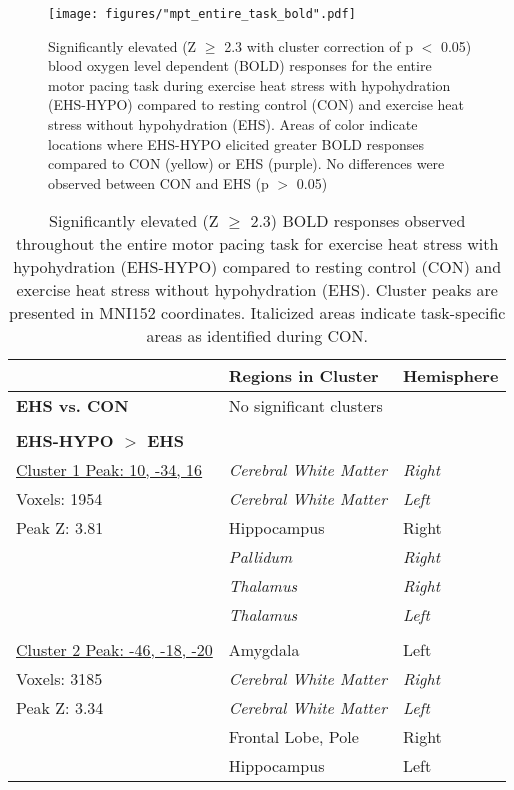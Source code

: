 \begin{figure}
	\centering
	\texttt{[image: figures/"mpt\_entire\_task\_bold".pdf]}
	\caption{Significantly elevated (Z ${\ge}$ 2.3 with cluster correction of p ${<}$ 0.05) blood oxygen level dependent (BOLD) responses for the entire motor pacing task during exercise heat stress with hypohydration (EHS-HYPO) compared to resting control (CON) and exercise heat stress without hypohydration (EHS). Areas of color indicate locations where EHS-HYPO elicited greater BOLD responses compared to CON (yellow) or EHS (purple). No differences were observed between CON and EHS (p ${>}$ 0.05)}
	\label{fig:mpt_entire_task_bold}	
\end{figure}

\begin{table}
	\caption{Significantly elevated (Z ${\ge}$ 2.3) BOLD responses observed throughout the entire motor pacing task for exercise heat stress with hypohydration (EHS-HYPO) compared to resting control (CON) and exercise heat stress without hypohydration (EHS). Cluster peaks are presented in MNI152 coordinates. Italicized areas indicate task-specific areas as identified during CON.}
	\centering
	\begin{tabular}{lll} 
		\hline
		& Regions in Cluster & Hemisphere \\
		\hline
		\textbf{EHS vs. CON} & No significant clusters & \\
		&& \\
		\textbf{EHS-HYPO ${>}$ EHS} && \\
		\underline{Cluster 1 Peak: 10, -34, 16} & \textit{Cerebral White Matter} & \textit{Right}  \\
		Voxels: 1954 & \textit{Cerebral White Matter} & \textit{Left} \\
		Peak Z: 3.81 & Hippocampus & Right \\
		& \textit{Pallidum} & \textit{Right} \\
		&\textit{Thalamus} & \textit{Right} \\
		& \textit{Thalamus} & \textit{Left} \\
		&& \\
		\underline{	Cluster 2 Peak: -46, -18, -20} & Amygdala & Left \\
		Voxels: 3185 & \textit{Cerebral White Matter} & \textit{Right} \\
		Peak Z: 3.34 & \textit{Cerebral White Matter} & \textit{Left} \\
		& Frontal Lobe, Pole & Right \\
		& Hippocampus & Left \\

\end{tabular}
\end{table}
